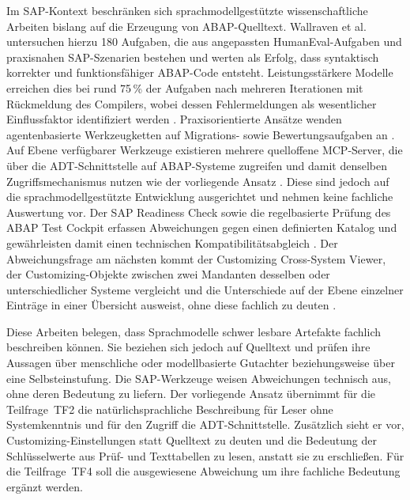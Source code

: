 Im SAP-Kontext beschränken sich sprachmodellgestützte wissenschaftliche Arbeiten bislang auf die Erzeugung von ABAP-Quelltext. Wallraven et al. untersuchen hierzu 180 Aufgaben, die aus angepassten HumanEval-Aufgaben und praxisnahen SAP-Szenarien bestehen und werten als Erfolg, dass syntaktisch korrekter und funktionsfähiger ABAP-Code entsteht. Leistungsstärkere Modelle erreichen dies bei rund 75\,\% der Aufgaben nach mehreren Iterationen mit Rückmeldung des Compilers, wobei dessen Fehlermeldungen als wesentlicher Einflussfaktor identifiziert werden \cite{wallraven_benchmarking_2026}. %
Praxisorientierte Ansätze wenden agentenbasierte Werkzeugketten auf Migrations- sowie Bewertungsaufgaben an \cite{dorairaj_deepa_sap_nodate}. Auf Ebene verfügbarer Werkzeuge existieren mehrere quelloffene MCP-Server, die über die ADT-Schnittstelle auf ABAP-Systeme zugreifen und damit denselben Zugriffsmechanismus nutzen wie der vorliegende Ansatz \cite{andreschak_mcp_abap_adt, fr0ster_mcp_abap_adt}. Diese sind jedoch auf die sprachmodellgestützte Entwicklung ausgerichtet und nehmen keine fachliche Auswertung vor.
Der SAP Readiness Check sowie die regelbasierte Prüfung des ABAP Test Cockpit erfassen Abweichungen gegen einen definierten Katalog und gewährleisten damit einen technischen Kompatibilitätsabgleich \cite{sap_ccm_atc}. Der Abweichungsfrage am nächsten kommt der Customizing Cross-System Viewer, der Customizing-Objekte zwischen zwei Mandanten desselben oder unterschiedlicher Systeme vergleicht und die Unterschiede auf der Ebene einzelner Einträge in einer Übersicht ausweist, ohne diese fachlich zu deuten \cite{sap_customizing_nodate}.

Diese Arbeiten belegen, dass Sprachmodelle schwer lesbare Artefakte fachlich beschreiben können. Sie beziehen sich jedoch auf Quelltext und prüfen ihre Aussagen über menschliche oder modellbasierte Gutachter beziehungsweise über eine Selbsteinstufung. Die SAP-Werkzeuge weisen Abweichungen technisch aus, ohne deren Bedeutung zu liefern. Der vorliegende Ansatz übernimmt für die Teilfrage~TF2 die natürlichsprachliche Beschreibung für Leser ohne Systemkenntnis und für den Zugriff die ADT-Schnittstelle. Zusätzlich sieht er vor, Customizing-Einstellungen statt Quelltext zu deuten und die Bedeutung der Schlüsselwerte aus Prüf- und Texttabellen zu lesen, anstatt sie zu erschließen. Für die Teilfrage~TF4 soll die ausgewiesene Abweichung um ihre fachliche Bedeutung ergänzt werden.


